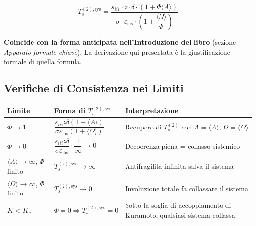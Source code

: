 \[
\boxed{T_s^{(2),\text{sys}} = \frac{s_{iii} \cdot z \cdot \delta \cdot \left(1 + \Phi \langle A \rangle\right)}{\sigma \cdot \varepsilon_{\text{dis}} \cdot \left(1 + \dfrac{\langle \Omega \rangle}{\Phi}\right)}}
\]

\Proved{} \textbf{Coincide con la forma anticipata nell'Introduzione del
libro} (sezione \emph{Apparato formale chiave}). La derivazione qui
presentata è la giustificazione formale di quella formula.

\subsection{Verifiche di Consistenza nei
Limiti}\label{verifiche-di-consistenza-nei-limiti}

{\def\LTcaptype{none} %
{\small\begin{longtable}[]{@{}
  >{\raggedright\arraybackslash}p{}
  >{\raggedright\arraybackslash}p{}
  >{\raggedright\arraybackslash}p{}@{}}
\toprule\noalign{}
\begin{minipage}[b]{\linewidth}\raggedright
Limite
\end{minipage} & \begin{minipage}[b]{\linewidth}\raggedright
Forma di \(T_s^{(2),\text{sys}}\)
\end{minipage} & \begin{minipage}[b]{\linewidth}\raggedright
Interpretazione
\end{minipage} \\
\midrule\noalign{}
\endhead
\bottomrule\noalign{}
\endlastfoot
\(\Phi \to 1\) &
\(\dfrac{s_{iii} z \delta (1+\langle A\rangle)}{\sigma \varepsilon_{\text{dis}} (1+\langle\Omega\rangle)}\)
& Recupero di \(T_s^{(2)}\) con \(A = \langle A\rangle\),
\(\Omega = \langle\Omega\rangle\) \Proved{} \\
\(\Phi \to 0\) &
\(\dfrac{s_{iii} z \delta}{\sigma \varepsilon_{\text{dis}}} \cdot \dfrac{1}{\infty} \to 0\)
& Decoerenza piena = collasso sistemico \Proved{} \\
\(\langle A\rangle \to \infty\), \(\Phi\) finito &
\(T_s^{(2),\text{sys}} \to \infty\) & Antifragilità infinita salva il
sistema \Proved{} \\
\(\langle\Omega\rangle \to \infty\), \(\Phi\) finito &
\(T_s^{(2),\text{sys}} \to 0\) & Involuzione totale fa collassare il
sistema \Proved{} \\
\(K < K_c\) & \(\Phi = 0 \Rightarrow T_s^{(2),\text{sys}} = 0\) & Sotto
la soglia di accoppiamento di Kuramoto, qualsiasi sistema collassa
\Proved{} \\
\end{longtable}}
}

